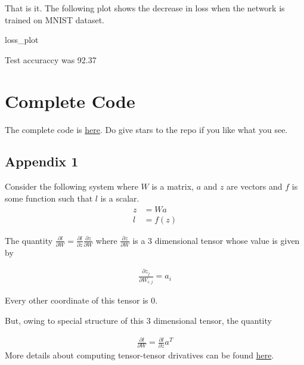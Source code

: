 \documentclass[10pt]{article}
\begin{document}
That is it. The following plot shows the decrease in loss when the network is trained on MNIST dataset. 

\begin{center}
  {loss_plot} %
\end{center}
Test accuraccy was 92.37 

\section{Complete Code}
The complete code is \href{https://github.com/nithishdivakar/blog-post-codes/blob/master/tiny-neural-network/nnv0.0.001.py}{here}. Do give stars to the repo if you like what you see. 

\subsection{Appendix 1}
Consider the following system where $W$ is a matrix, $a$ and $z$ are vectors and $f$ is some function such that $l$ is a scalar.
$$ \begin{aligned}
z &= Wa
\\
l &= f(z)
\end{aligned} $$

The quantity $\frac{\partial l}{\partial W} = \frac{\partial l}{\partial z}  \frac{\partial z}{\partial W}$ where $\frac{\partial z}{\partial W}$ is a 3 dimensional tensor whose value is given by 

$$ \begin{aligned}
\frac{\partial z_j}{\partial W_{i,j}} = a_i
\end{aligned} $$

Every other coordinate of this tensor is $0$. 

But, owing to special structure of this 3 dimensional tensor, the quantity 

$$ \begin{aligned}
\frac{\partial l}{\partial W} = \frac{\partial l}{\partial z}a^T
\end{aligned} $$
More details about computing tensor-tensor drivatives can be found \href{https://compsci697l.github.io/docs/vecDerivs.pdf}{here}.
\end{document}

